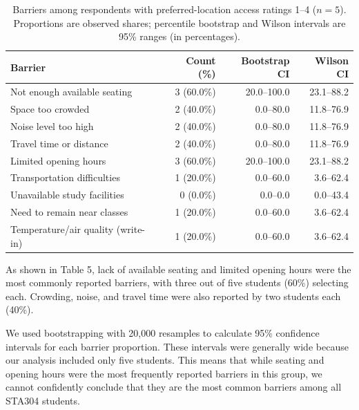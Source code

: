 \documentclass[11pt,letterpaper]{article}
\begin{document}
\begin{table}[H]\centering\footnotesize
\label{tab:primarybarriers}
\begin{tabular}{@{}p{5.7cm}rrr@{}}\toprule
Barrier & Count (\%) & Bootstrap CI & Wilson CI\\\midrule
Not enough available seating & 3 (60.0\%) & 20.0--100.0 & 23.1--88.2\\
Space too crowded & 2 (40.0\%) & 0.0--80.0 & 11.8--76.9\\
Noise level too high & 2 (40.0\%) & 0.0--80.0 & 11.8--76.9\\
Travel time or distance & 2 (40.0\%) & 0.0--80.0 & 11.8--76.9\\
Limited opening hours & 3 (60.0\%) & 20.0--100.0 & 23.1--88.2\\
Transportation difficulties & 1 (20.0\%) & 0.0--60.0 & 3.6--62.4\\
Unavailable study facilities & 0 (0.0\%) & 0.0--0.0 & 0.0--43.4\\
Need to remain near classes & 1 (20.0\%) & 0.0--60.0 & 3.6--62.4\\
Temperature/air quality (write-in) & 1 (20.0\%) & 0.0--60.0 & 3.6--62.4\\\bottomrule\end{tabular}
\caption{Barriers among respondents with preferred-location access ratings 1--4 ($n=5$). Proportions are observed shares; percentile bootstrap and Wilson intervals are 95\% ranges (in percentages).}
\end{table}

As shown in Table 5, lack of available seating and limited opening hours were the most commonly reported barriers, with three out of five students (60\%) selecting each. Crowding, noise, and travel time were also reported by two students each (40\%).

We used bootstrapping with 20,000 resamples to calculate 95\% confidence intervals for each barrier proportion. These intervals were generally wide because our analysis included only five students. This means that while seating and opening hours were the most frequently reported barriers in this group, we cannot confidently conclude that they are the most common barriers among all STA304 students.
\end{document}
